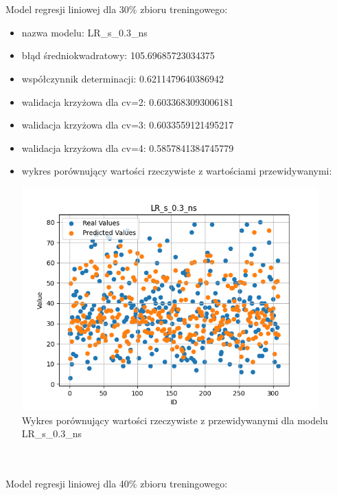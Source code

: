\documentclass[11pt, a4paper, notitlepage]{report}
\begin{document}
\\ \\
Model regresji liniowej dla 30\% zbioru treningowego:
\begin{itemize}
	\item nazwa modelu: LR\_s\_0.3\_ns
	\item błąd średniokwadratowy: 105.69685723034375
	\item współczynnik determinacji: 0.6211479640386942
	\item walidacja krzyżowa dla cv=2: 0.6033683093006181
	\item walidacja krzyżowa dla cv=3: 0.6033559121495217
	\item walidacja krzyżowa dla cv=4: 0.5857841384745779
	\item wykres porównujący wartości rzeczywiste z wartościami przewidywanymi: \begin{center} \small
		\includegraphics[width=0.9\textwidth]{graphics/plots/LR_s_0.3_ns.png} \\
		\caption{Wykres porównujący wartości rzeczywiste z przewidywanymi dla modelu LR\_s\_0.3\_ns}
	\end{center}
	\end{itemize}
\\ \\
Model regresji liniowej dla 40\% zbioru treningowego:
\end{document}
